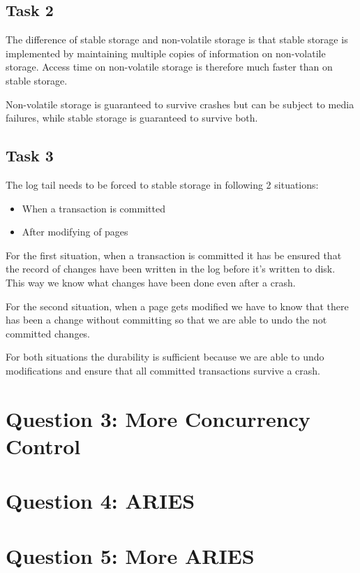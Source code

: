 \documentclass[12pt,a4paper]{article}
\begin{document}
\subsection{Task 2}
The difference of stable storage and non-volatile storage is that stable storage is implemented by maintaining multiple copies of information on non-volatile storage.
Access time on non-volatile storage is therefore much faster than on stable storage.

Non-volatile storage is guaranteed to survive crashes but can be subject to media failures, while stable storage is guaranteed to survive both.


\subsection{Task 3}
The log tail needs to be forced to stable storage in following 2 situations:
\begin{itemize}
	\item When a transaction is committed
	\item After modifying of pages	
\end{itemize}

For the first situation, when a transaction is committed it has be ensured that the record of changes have been written in the log before it's written to disk.
This way we know what changes have been done even after a crash.

For the second situation, when a page gets modified we have to know that there has been a change without committing so that we are able to undo the not committed changes. 

For both situations the durability is sufficient because we are able to undo modifications and ensure that all committed transactions survive a crash.

\section{Question 3: More Concurrency Control}

\section{Question 4: ARIES}

\section{Question 5: More ARIES}
\end{document}
